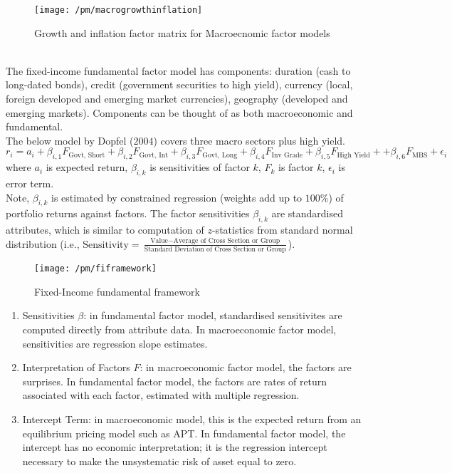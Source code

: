 \begin{figure}[H]
\centering
\texttt{[image: /pm/macrogrowthinflation]}
\caption{Growth and inflation factor matrix for Macroecnomic factor models}
\end{figure}

\begin{definition} \\
The fixed-income fundamental factor model has components: duration (cash to long-dated bonds), credit (government securities to high yield), currency (local, foreign developed and emerging market currencies), geography (developed and emerging markets). Components can be thought of as both macroeconomic and fundamental.\\
The below model by Dopfel ($2004$) covers three macro sectors plus high yield.
\begin{equation}
r_i = a_i + \beta_{i,1} F_{\text{Govt, Short}} + \beta_{i,2} F_{\text{Govt, Int}} + \beta_{i,3} F_{\text{Govt, Long}} + \beta_{i,4} F_{\text{Inv Grade}} + \beta_{i,5} F_{\text{High Yield}} + + \beta_{i,6} F_{\text{MBS}} + \epsilon_i \nonumber
\end{equation}
where $a_i$ is expected return, $\beta_{i,k}$ is sensitivities of factor $k$, $F_k$ is factor $k$, $\epsilon_i$ is error term.\\
Note, $\beta_{i,k}$ is estimated by constrained regression (weights add up to $100\%$) of portfolio returns against factors. The factor sensitivities $\beta_{i,k}$ are standardised attributes, which is similar to computation of $z$-statistics from standard normal distribution (i.e., $\text{Sensitivity} = \frac{\text{Value} - \text{Average of Cross Section or Group}}{\text{Standard Deviation of Cross Section or Group}}$).
\end{definition}

\begin{figure}[H]
\centering
\texttt{[image: /pm/fiframework]}
\caption{Fixed-Income fundamental framework}
\end{figure}

\begin{remark} 
\begin{enumerate}[label=\roman*.]
\setlength{\itemsep}{0pt}
\item Sensitivities $\beta$: in fundamental factor model, standardised sensitivites are computed directly from attribute data. In macroeconomic factor model, sensitivities are regression slope estimates.
\item Interpretation of Factors $F$: in macroeconomic factor model, the factors are surprises. In fundamental factor model, the factors are rates of return associated with each factor, estimated with multiple regression.
\item Intercept Term: in macroeconomic model, this is the expected return from an equilibrium pricing model such as APT. In fundamental factor model, the intercept has no economic interpretation; it is the regression intercept necessary to make the unsystematic risk of asset equal to zero.
\end{enumerate}
\end{remark}

